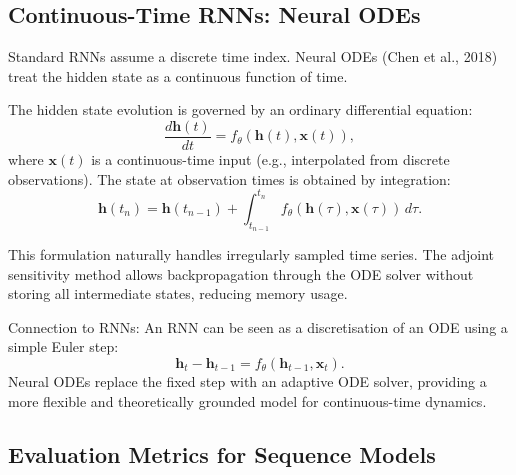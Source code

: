 \documentclass{tufte-handout}
\begin{document}
\subsection{Continuous-Time RNNs: Neural ODEs}

Standard RNNs assume a discrete time index. Neural ODEs (Chen et al., 2018) treat the hidden state as a continuous function of time.

\begin{defn}
    The hidden state evolution is governed by an ordinary differential equation:
    \[
    \frac{d\mathbf{h}(t)}{dt} = f_\theta(\mathbf{h}(t), \mathbf{x}(t)),
    \]
    where $\mathbf{x}(t)$ is a continuous-time input (e.g., interpolated from discrete observations). The state at observation times is obtained by integration:
    \[
    \mathbf{h}(t_n) = \mathbf{h}(t_{n-1}) + \int_{t_{n-1}}^{t_n} f_\theta(\mathbf{h}(\tau), \mathbf{x}(\tau)) \, d\tau.
    \]
\end{defn}

This formulation naturally handles irregularly sampled time series. The adjoint sensitivity method allows backpropagation through the ODE solver without storing all intermediate states, reducing memory usage.

\begin{marginfigure}
\centering
{}
\caption{Continuous hidden state $\mathbf{h}(t)$ (line) with discrete observations (dots) at irregular times.}
\end{marginfigure}

Connection to RNNs: An RNN can be seen as a discretisation of an ODE using a simple Euler step:
\[
\mathbf{h}_t - \mathbf{h}_{t-1} = f_\theta(\mathbf{h}_{t-1}, \mathbf{x}_t).
\]
Neural ODEs replace the fixed step with an adaptive ODE solver, providing a more flexible and theoretically grounded model for continuous-time dynamics.

\subsection{Evaluation Metrics for Sequence Models}
\end{document}
